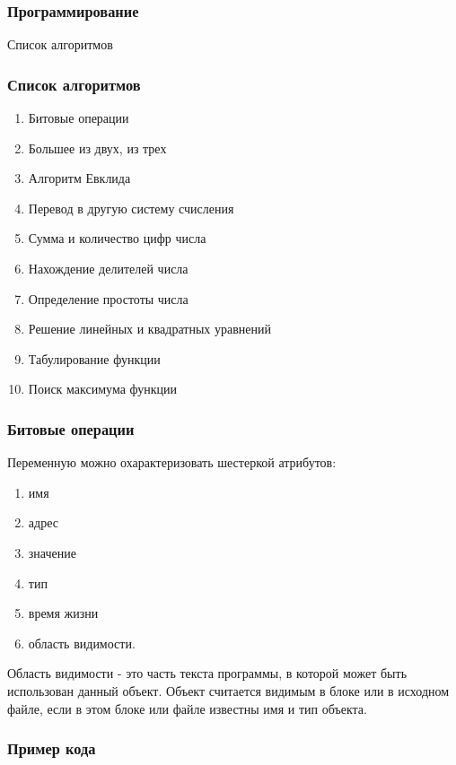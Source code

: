 \subtitle{Лекция 10 --- Программирование: Числовые алгоритмы}

\frame[plain]
{\titlepage}	%


\begin{frame}
\frametitle{Программирование}

\begin{center}

\Huge
Список алгоритмов	
\end{center}
\end{frame}

	\begin{frame}
\frametitle{Список алгоритмов}
\begin{enumerate}
	\item Битовые операции
	\item Большее из двух, из трех
	\item Алгоритм Евклида
	\item Перевод в другую систему счисления
	\item Сумма и количество цифр числа
	\item Нахождение делителей числа
	\item Определение простоты числа
	\item Решение линейных и квадратных уравнений
	\item Табулирование функции
	\item Поиск максимума функции
\end{enumerate}
\end{frame}

	


	\begin{frame}
\frametitle{Битовые операции}

Переменную можно охарактеризовать шестеркой атрибутов:
\setlength{\columnsep}{0.4cm}
\begin{multicols}{2}
\begin{enumerate}
\item имя
\item адрес
\item значение
\item тип
\item время жизни
\item область видимости.
\end{enumerate}

\columnbreak
 \small
Область видимости - это часть текста программы, в которой может быть использован данный объект. Объект считается видимым в блоке или в исходном файле, если в этом блоке или файле известны имя и тип объекта. 
\end{multicols}

\end{frame}

\begin{frame}[fragile]
\frametitle{Пример кода}



\end{frame}

